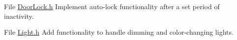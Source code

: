
\begin{DoxyRefList}
\item[File \mbox{\hyperlink{DoorLock_8h}{Door\+Lock.h}} ]\label{todo__todo000001}%
%
Implement auto-\/lock functionality after a set period of inactivity.  
\item[File \mbox{\hyperlink{Light_8h}{Light.h}} ]\label{todo__todo000002}%
%
Add functionality to handle dimming and color-\/changing lights. 
\end{DoxyRefList}